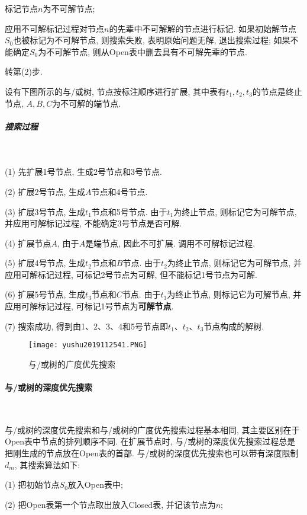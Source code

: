      标记节点$n$为不可解节点;

     应用不可解标记过程对节点$n$的先辈中不可解解的节点进行标记. 如果初始解节点$S_0$也被标记为不可解节点, 则搜索失败, 表明原始问题无解, 退出搜索过程; 如果不能确定$S_0$为不可解节点, 则从Open表中删去具有不可解先辈的节点.

     转第(2)步.
\begin{example}
  设有下图所示的与/或树, 节点按标注顺序进行扩展, 其中表有$t_1,t_2,t_3$的节点是终止节点, $A,B,C$为不可解的端节点.
\end{example}
\subparagraph{搜索过程}~{}

(1) 先扩展1号节点, 生成2号节点和3号节点.

(2) 扩展2号节点, 生成$A$节点和4号节点.

(3) 扩展3号节点, 生成$t_1$节点和5号节点. 由于$t_1$为终止节点, 则标记它为可解节点, 并应用可解标记过程, 不能确定3号节点是否可解.

(4)  扩展节点$A$, 由于$A$是端节点, 因此不可扩展. 调用不可解标记过程.

(5) 扩展4号节点, 生成$t_2$节点和$B$节点. 由于$t_2$为终止节点, 则标记它为可解节点, 并应用可解标记过程, 可标记2号节点为可解, 但不能标记1号节点为可解.

(6) 扩展5号节点, 生成$t_3$节点和$C$节点. 由于$t_3$为终止节点, 则标记它为可解节点, 并应用可解标记过程, 可标记1号节点为\textbf{可解节点}.

(7) 搜索成功, 得到由1、2、3、4和5号节点即$t_1$、$t_2$、$t_3$节点构成的解树.
\begin{figure}[H]
\centering
\texttt{[image: yushu2019112541.PNG]}
\caption{与/或树的广度优先搜索}
\label{AI32fig41}
\end{figure}
\paragraph{与/或树的深度优先搜索}~{}

与/或树的深度优先搜索和与/或树的广度优先搜索过程基本相同, 其主要区别在于Open表中节点的排列顺序不同. 在扩展节点时, 与/或树的深度优先搜索过程总是把刚生成的节点放在Open表的首部.
与/或树的深度优先搜索也可以带有深度限制$d_m$, 其搜索算法如下:

(1) 把初始节点$S_0$放入Open表中;

(2) 把Open表第一个节点取出放入Closed表, 并记该节点为$n$;

